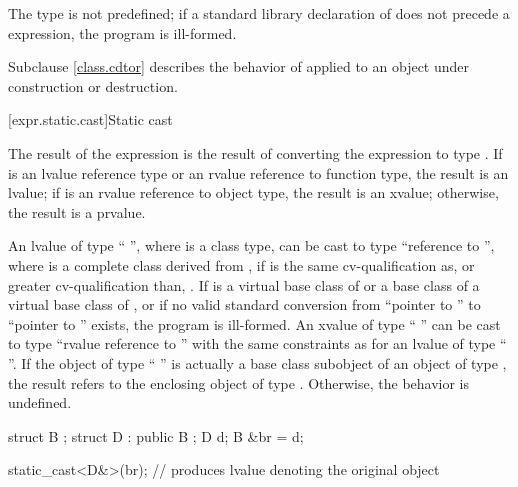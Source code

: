 \pnum
The type  is not predefined;
if a standard library declaration of
 does not precede
a  expression, the program is ill-formed.

\pnum
\begin{note}
Subclause \ref{class.cdtor} describes the behavior of 
applied to an object under construction or destruction.
\end{note}

[expr.static.cast]{Static cast}

\pnum
{}%
%
The result of the expression  is the result of
converting the expression  to type .
%
%
If  is an lvalue reference type
or an rvalue reference to function type, the result is an lvalue;
if  is an rvalue reference to object type, the result is an xvalue;
otherwise, the result is a prvalue.

\pnum
{}%
%
An lvalue of type `` '', where  is a class
type, can be cast to type ``reference to  '', where
 is a complete class derived from ,
if  is the
same cv-qualification as, or greater cv-qualification than,
. If  is a virtual base class of 
or a base class of a virtual base class of ,
or if no valid standard conversion from ``pointer to ''
to ``pointer to '' exists, the program is ill-formed.
An xvalue of type
`` '' can be cast to type ``rvalue reference to
 '' with the same constraints as for an lvalue of
type `` ''. If the object
of type `` '' is actually a base class subobject of an object
of type , the result refers to the enclosing object of type
. Otherwise, the behavior is undefined.
\begin{example}
\begin{codeblock}
struct B { };
struct D : public B { };
D d;
B &br = d;

static_cast<D&>(br);            // produces lvalue denoting the original  object
\end{codeblock}
\end{example}

